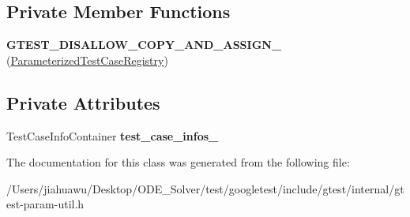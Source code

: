 \subsection*{Private Member Functions}
\begin{DoxyCompactItemize}
\item 
\mbox{\label{classtesting_1_1internal_1_1_parameterized_test_case_registry_ad4b492ca1c7f0cf14db6dde5f462644d}} 
{\bfseries G\+T\+E\+S\+T\+\_\+\+D\+I\+S\+A\+L\+L\+O\+W\+\_\+\+C\+O\+P\+Y\+\_\+\+A\+N\+D\+\_\+\+A\+S\+S\+I\+G\+N\+\_\+} (\mbox{\hyperlink{classtesting_1_1internal_1_1_parameterized_test_case_registry}{Parameterized\+Test\+Case\+Registry}})
\end{DoxyCompactItemize}
\subsection*{Private Attributes}
\begin{DoxyCompactItemize}
\item 
\mbox{\label{classtesting_1_1internal_1_1_parameterized_test_case_registry_a10be2f29d41be96c14d976f0cda3d0f7}} 
Test\+Case\+Info\+Container {\bfseries test\+\_\+case\+\_\+infos\+\_\+}
\end{DoxyCompactItemize}


The documentation for this class was generated from the following file\+:\begin{DoxyCompactItemize}
\item 
/\+Users/jiahuawu/\+Desktop/\+O\+D\+E\+\_\+\+Solver/test/googletest/include/gtest/internal/gtest-\/param-\/util.\+h\end{DoxyCompactItemize}
